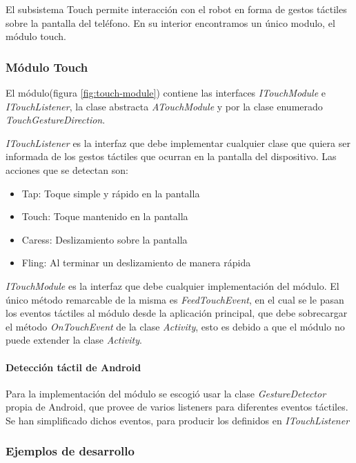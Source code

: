 El subsistema Touch permite interacción con el robot en forma de gestos táctiles sobre la pantalla del teléfono. En su interior encontramos un único modulo, el módulo touch.
\subsubsection{Módulo Touch}
El módulo(figura \ref{fig:touch-module}) contiene las interfaces \textit{ITouchModule} e \textit{ITouchListener}, la clase abstracta \textit{ATouchModule} y por la clase enumerado \textit{TouchGestureDirection}.

\textit{ITouchListener} es la interfaz que debe implementar cualquier clase que quiera ser informada de los gestos táctiles que ocurran en la pantalla del dispositivo. Las acciones que se detectan son:

\begin{itemize}
	\item  Tap: Toque simple y rápido en la pantalla
	\item  Touch: Toque mantenido en la pantalla
	\item  Caress: Deslizamiento sobre la pantalla
	\item  Fling: Al terminar un deslizamiento de manera rápida
\end{itemize}


\textit{ITouchModule} es la interfaz que debe cualquier implementación del módulo. El único método remarcable de la misma es \textit{FeedTouchEvent}, en el cual se le pasan los eventos táctiles al módulo desde la aplicación principal, que debe sobrecargar el método \textit{OnTouchEvent} de la clase \textit{Activity}, esto es debido a que el módulo no puede extender la clase \textit{Activity}.

\paragraph*{Detección táctil de Android\\}


Para la implementación del módulo se escogió usar la clase \textit{GestureDetector} propia de Android, que provee de varios listeners para diferentes eventos táctiles.
Se han simplificado dichos eventos, para producir los definidos en \textit{ITouchListener}

\subsubsection*{Ejemplos de desarrollo}

